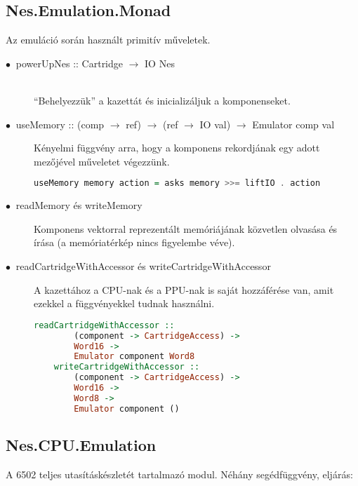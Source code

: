\subsection{Nes.Emulation.Monad}
Az emuláció során használt primitív műveletek.
\begin{description}
	\item[$\bullet\:$ powerUpNes :: Cartridge $\rightarrow$ IO Nes] \hfill \\
	``Behelyezzük'' a kazettát és inicializáljuk a komponenseket. 
	\item[$\bullet\:$ useMemory :: (comp $\rightarrow$ ref) $\rightarrow$ (ref $\rightarrow$ IO val) $\rightarrow$ Emulator comp val]
	Kényelmi függvény arra, hogy a komponens rekordjának egy adott mezőjével műveletet végezzünk.
	\begin{lstlisting}[language=Haskell]
	useMemory memory action = asks memory >>= liftIO . action
	\end{lstlisting}
	\item[$\bullet\:$ readMemory és writeMemory]
	Komponens vektorral reprezentált memóriájának közvetlen olvasása és írása (a memóriatérkép nincs figyelembe véve).
	\item[$\bullet\:$ readCartridgeWithAccessor és writeCartridgeWithAccessor]
	A kazettához a CPU-nak és a PPU-nak is saját hozzáférése van, amit ezekkel a függvényekkel tudnak használni.
	\begin{lstlisting}[language=Haskell, basicstyle=\scriptsize]
	readCartridgeWithAccessor :: 
		(component -> CartridgeAccess) -> 
		Word16 -> 
		Emulator component Word8
	writeCartridgeWithAccessor ::
		(component -> CartridgeAccess) -> 
		Word16 ->
		Word8 -> 
		Emulator component ()
	\end{lstlisting}
\end{description}

\subsection{Nes.CPU.Emulation}
A 6502 teljes utasításkészletét tartalmazó modul. Néhány segédfüggvény, eljárás:

